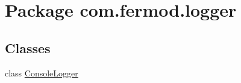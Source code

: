 \hypertarget{a00017}{}\section{Package com.\+fermod.\+logger}
\label{a00017}
\subsection*{Classes}
\begin{DoxyCompactItemize}
\item 
class \mbox{\hyperlink{a00030}{Console\+Logger}}
\end{DoxyCompactItemize}
